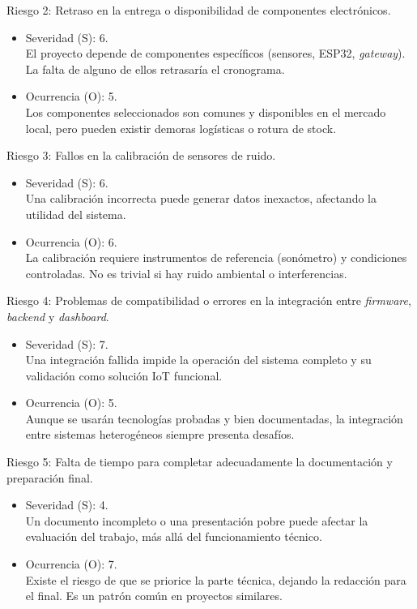 \documentclass[
11pt, %
]{charter}
\begin{document}
\newpage

Riesgo 2: Retraso en la entrega o disponibilidad de componentes electrónicos.
\begin{itemize}
	\item Severidad (S): 6.\\
	El proyecto depende de componentes específicos (sensores, ESP32, \textit{gateway}). La falta de alguno de ellos retrasaría el cronograma.
	\item Ocurrencia (O): 5.\\
	Los componentes seleccionados son comunes y disponibles en el mercado local, pero pueden existir demoras logísticas o rotura de stock.
\end{itemize}

Riesgo 3: Fallos en la calibración de sensores de ruido.
\begin{itemize}
	\item Severidad (S): 6.\\
	Una calibración incorrecta puede generar datos inexactos, afectando la utilidad del sistema.
	\item Ocurrencia (O): 6.\\
	La calibración requiere instrumentos de referencia (sonómetro) y condiciones controladas. No es trivial si hay ruido ambiental o interferencias.
\end{itemize}

Riesgo 4: Problemas de compatibilidad o errores en la integración entre \textit{firmware}, \textit{backend} y \textit{dashboard}.
\begin{itemize}
	\item Severidad (S): 7.\\
	Una integración fallida impide la operación del sistema completo y su validación como solución IoT funcional.
	\item Ocurrencia (O): 5.\\
	Aunque se usarán tecnologías probadas y bien documentadas, la integración entre sistemas heterogéneos siempre presenta desafíos.
\end{itemize}

Riesgo 5: Falta de tiempo para completar adecuadamente la documentación y preparación final.
\begin{itemize}
	\item Severidad (S): 4.\\
	Un documento incompleto o una presentación pobre puede afectar la evaluación del trabajo, más allá del funcionamiento técnico.
	\item Ocurrencia (O): 7.\\
	Existe el riesgo de que se priorice la parte técnica, dejando la redacción para el final. Es un patrón común en proyectos similares.
\end{itemize}
\end{document}

